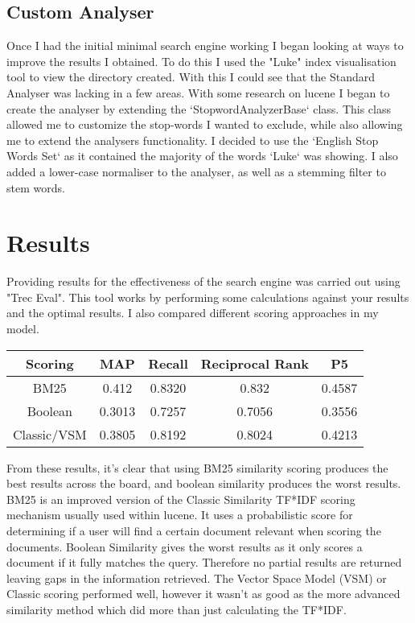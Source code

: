 \documentclass{article}
\begin{document}
\subsection{Custom Analyser}
Once I had the initial minimal search engine working I began looking at ways to improve the results I obtained. To do this I used the "Luke" index visualisation tool to view the directory created. With this I could see that the Standard Analyser was lacking in a few areas. With some research on lucene I began to create the analyser by extending the  `StopwordAnalyzerBase` class. This class allowed me to customize the stop-words I wanted to exclude, while also allowing me to extend the analysers functionality. I decided to use the `English Stop Words Set` as it contained the majority of the words `Luke` was showing. I also added a lower-case normaliser to the analyser, as well as a stemming filter to stem words.

\section{Results}
Providing results for the effectiveness of the search engine was carried out using "Trec Eval". This tool works by performing some calculations against your results and the optimal results. I also compared different scoring approaches in my model.
\begin{center}
\begin{tabular}{
|| c c c c c ||
}
\hline Scoring & MAP & Recall & Reciprocal Rank & P5 \\
\hline\hline
BM25 & 0.412 & 0.8320 & 0.832 & 0.4587 \\
\hline
Boolean & 0.3013 & 0.7257 & 0.7056 & 0.3556 \\
\hline
Classic/VSM & 0.3805 & 0.8192 & 0.8024 & 0.4213\\
\hline

\end{tabular}
\end{center}

From these results, it's clear that using BM25 similarity scoring produces the best results across the board, and boolean similarity produces the worst results. BM25 is an improved version of the Classic Similarity TF*IDF scoring mechanism usually used within lucene. It uses a probabilistic score for determining if a user will find a certain document relevant when scoring the documents. Boolean Similarity gives the worst results as it only scores a document if it fully matches the query. Therefore no partial results are returned leaving gaps in the information retrieved. The Vector Space Model (VSM) or Classic scoring performed well, however it wasn't as good as the more advanced similarity method which did more than just calculating the TF*IDF.
\end{document}
